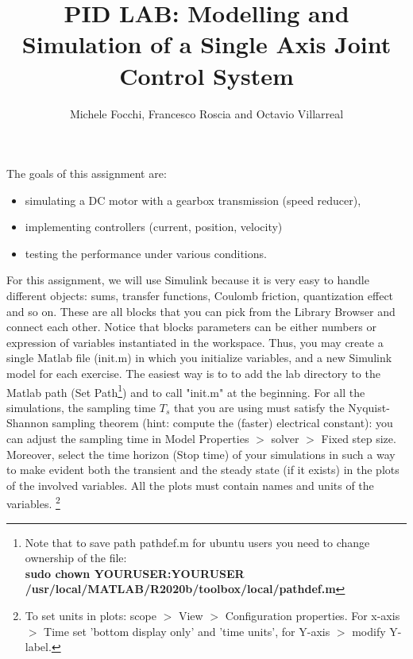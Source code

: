\documentclass[11pt]{article}
\title{PID LAB: Modelling and Simulation of a Single Axis Joint Control System }
\author{Michele Focchi, Francesco Roscia and Octavio Villarreal}
\date{}
\begin{document}
\maketitle
The goals of this assignment are:
\begin{itemize}
    \item simulating a DC motor with a gearbox transmission (speed reducer),
    \item implementing controllers (current, position, velocity)
    \item testing the performance under various conditions.
\end{itemize}
%
%
For this assignment, we will use Simulink because it is very easy to handle different 
objects: sums, transfer functions, Coulomb friction, quantization effect and so on. 
These  are all blocks that you can pick from the Library Browser and connect each other. 
Notice that blocks parameters can be either numbers or expression of variables instantiated in the workspace. 
Thus, you may create a single Matlab file (init.m) in which you initialize variables, and a new Simulink model for each exercise. 
The easiest way is to to add the lab directory to the Matlab path (Set Path\footnote{Note that to save path pathdef.m for ubuntu users you need to change ownership of the file: \\ \textbf{sudo chown YOURUSER:YOURUSER /usr/local/MATLAB/R2020b/toolbox/local/pathdef.m}}) and to 
call "init.m" at the beginning.
For all the simulations, the sampling time $T_s$ that you are using must satisfy 
the Nyquist-Shannon sampling theorem (hint: compute the (faster) electrical constant): 
you can adjust the sampling time in Model Properties $>$ solver $>$ Fixed step size. %
Moreover, select the time horizon (Stop time) of your simulations in such a way to 
make evident both the transient and the steady state (if it exists) 
in the plots of the involved variables. All the plots must contain names and units of the variables.
\footnote{To set units in plots: scope $>$ View $>$ Configuration properties. For x-axis $>$ Time set 'bottom display only' and 'time units', for Y-axis $>$ modify Y-label.}


%
\end{document}
